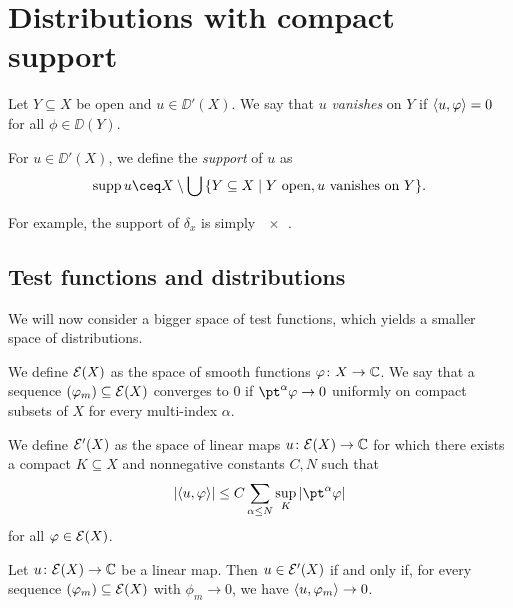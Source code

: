 \section{Distributions with compact support}
\begin{definition}
	Let $Y \subseteq X$ be open and $u \in \DD'(X)$. We say that $u$ \emph{vanishes} on $Y$ if $\langle u, \varphi\rangle = 0$ for all $\phi \in \DD(Y)$. 
\end{definition}

\begin{definition}
	For $u \in \DD'(X)$, we define the \emph{support} of $u$ as
	\[
	\supp u \ceq X \setminus \bigcup\qty{Y \subseteq X \mid Y \text{ open}, u \text{ vanishes on $Y$}}. 
	\]
\end{definition}
For example, the support of $\delta_x$ is simply $\qty{x}$. 

\subsection{Test functions and distributions}
We will now consider a bigger space of test functions, which yields a smaller space of distributions. 
\begin{definition}
	We define $\mathcal E(X)$ as the space of smooth functions $\varphi \colon X \to \mathbb C$. We say that a sequence $(\varphi_m) \subseteq \mathcal E(X)$ converges to 0 if $\pt^\alpha\phi \to 0$ uniformly on compact subsets of $X$ for every multi-index $\alpha$. 
\end{definition}

\begin{definition}
	We define 
	$\mathcal E'(X)$ as the space of linear maps $u \colon \mathcal E(X) \to \mathbb C$ for which there exists a compact $K \subseteq X$ and nonnegative constants $C, N$ such that
	\begin{equation} \label{eq:dist_compact_support}
	\abs{\ang{u, \phi}} \leq C \sum_{\alpha \leq N} \sup_K \abs{\pt^\alpha\phi}
	\end{equation}
	for all $\varphi \in \mathcal E(X)$. 
\end{definition}

\begin{lemma} \label{lem:seq_continuity_compact_support}
	Let $u \colon \mathcal E(X) \to \mathbb C$ be a linear map. Then $u \in \mathcal E'(X)$ if and only if, for every sequence $(\varphi_m) \subseteq \mathcal E(X)$ with $\phi_m \to 0$, we have $\langle u, \varphi_m\rangle \to 0$. 
\end{lemma}

